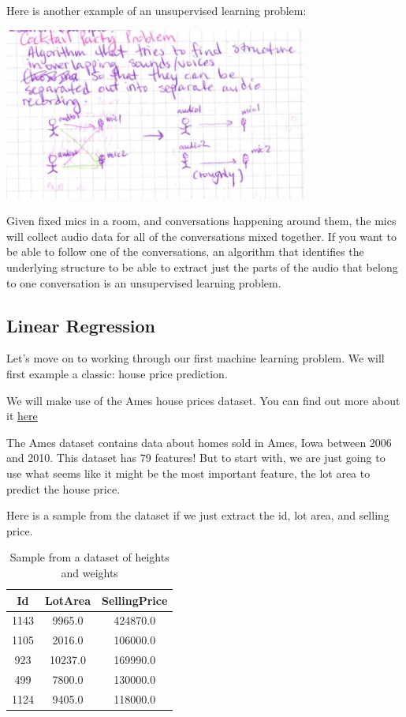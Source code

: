 \documentclass[12pt]{article}
\begin{document}
Here is another example of an unsupervised learning problem:

\includegraphics[width={0.75\textwidth}]{cocktail-party}

Given fixed mics in a room, and conversations happening around them, the mics will collect audio data for all of the conversations mixed together. If you want to be able to follow one of the conversations, an algorithm that identifies the underlying structure to be able to extract just the parts of the audio that belong to one conversation is an unsupervised learning problem.

\subsection{Linear Regression}
Let's move on to working through our first machine learning problem. We will first example a classic: house price prediction.

We will make use of the Ames house prices dataset. You can find out more about it \href{https://www.kaggle.com/c/house-prices-advanced-regression-techniques/data}{here}

The Ames dataset contains data about homes sold in Ames, Iowa between 2006 and 2010. This dataset has 79 features! But to start with, we are just going to use what seems like it might be the most important feature, the lot area to predict the house price.

Here is a sample from the dataset if we just extract the id, lot area, and selling price.
\begin{table}[htp]
\caption{Sample from a dataset of heights and weights}
\begin{center}
\begin{tabular}{|c|c|c|}
\hline
Id & LotArea & SellingPrice  \\ \hline
1143 & 9965.0 & 424870.0 \\
1105 & 2016.0 & 106000.0 \\
923 & 10237.0 & 169990.0 \\
499& 7800.0 & 130000.0 \\
1124 & 9405.0 & 118000.0 \\
\hline
\end{tabular}
\end{center}
\label{Sample from the Ames housing prices dataset.}
\end{table}%
\end{document}
